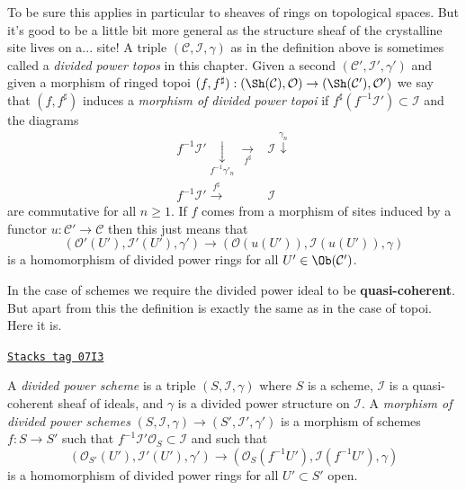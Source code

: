 To be sure this applies in particular to sheaves of rings on
topological spaces. But it's good to be a little bit more general
as the structure sheaf of the crystalline site lives on a... site!
A triple $(\mathcal{C}, \mathcal{I}, \gamma)$ as in the
definition above is sometimes called a {\it divided power topos}
in this chapter. Given a second $(\mathcal{C}', \mathcal{I}', \gamma')$ and
given a morphism of ringed topoi
$(f, f^\sharp) : (\Sh(\mathcal{C}), \mathcal{O}) \to
(\Sh(\mathcal{C}'), \mathcal{O}')$
we say that $(f, f^\sharp)$ induces a {\it morphism of divided
power topoi} if $f^\sharp(f^{-1}\mathcal{I}') \subset \mathcal{I}$
and the diagrams
$$
\begin{array}{cc}f^{-1}\mathcal{I}' \underset{f^{-1}\gamma'_n}{\downarrow}\underset{f^\sharp}{\longrightarrow} & \mathcal{I} \overset{\gamma_n}{\downarrow} \\ f^{-1}\mathcal{I}' \overset{f^\sharp}{\longrightarrow} & \mathcal{I}\end{array}
$$
are commutative for all $n \geq 1$. If $f$ comes from a morphism of
sites induced by a functor $u : \mathcal{C}' \to \mathcal{C}$ then
this just means that
$$
(\mathcal{O}'(U'), \mathcal{I}'(U'), \gamma')
\longrightarrow
(\mathcal{O}(u(U')), \mathcal{I}(u(U')), \gamma)
$$
is a homomorphism of divided power rings for all $U' \in \Ob(\mathcal{C}')$.

\medskip\noindent
In the case of schemes we require the divided power ideal to be
{\bf quasi-coherent}. But apart from this the definition is exactly
the same as in the case of topoi. Here it is.

\begin{definition}
\label{crystalline-definition-divided-power-scheme}
\href{https://stacks.math.columbia.edu/tag/07I3}{\texttt{Stacks tag 07I3}}

A {\it divided power scheme} is a triple $(S, \mathcal{I}, \gamma)$
where $S$ is a scheme, $\mathcal{I}$ is a quasi-coherent sheaf of
ideals, and $\gamma$ is a divided power structure on $\mathcal{I}$.
A {\it morphism of divided power schemes}
$(S, \mathcal{I}, \gamma) \to (S', \mathcal{I}', \gamma')$ is
a morphism of schemes $f : S \to S'$ such that
$f^{-1}\mathcal{I}'\mathcal{O}_S \subset \mathcal{I}$ and such that
$$
(\mathcal{O}_{S'}(U'), \mathcal{I}'(U'), \gamma')
\longrightarrow
(\mathcal{O}_S(f^{-1}U'), \mathcal{I}(f^{-1}U'), \gamma)
$$
is a homomorphism of divided power rings for all $U' \subset S'$ open.
\end{definition}


